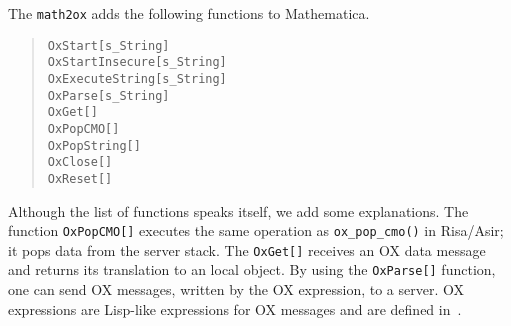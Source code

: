 The {\tt math2ox} adds the following functions to Mathematica.
\begin{quote}
{\tt OxStart[s\_String]} \\
{\tt OxStartInsecure[s\_String]} \\
{\tt OxExecuteString[s\_String]}  \\
{\tt OxParse[s\_String]} \\
{\tt OxGet[]} \\
{\tt OxPopCMO[]} \\
{\tt OxPopString[]} \\
{\tt OxClose[]} \\
{\tt OxReset[]}
\end{quote}
Although the list of functions speaks itself,
we add some explanations.
The function {\tt OxPopCMO[]} executes the same operation
as {\tt ox\_pop\_cmo()} in Risa/Asir;
it pops data from the server stack.
The {\tt OxGet[]} receives an OX data message
and returns its translation to an local object.
By using the {\tt OxParse[]} function, one can send OX messages,
written by the OX expression, to a server. 
OX expressions are Lisp-like expressions for OX messages and are defined
in~\cite{noro-takayama}.  

